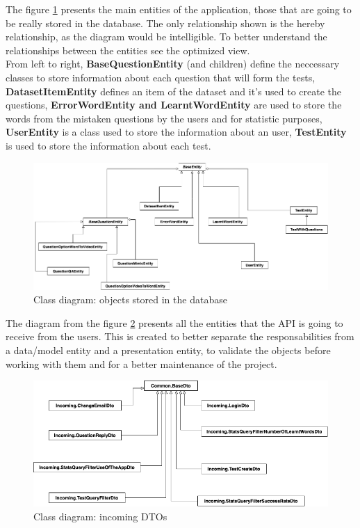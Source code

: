             The figure \ref{fig:implementation_entities_db} presents the main entities of the application, those that 
            are going to be really stored in the database. The only relationship shown is the hereby relationship, as the diagram would be intelligible. To better understand the 
            relationships between the entities see the optimized view. \\
            From left to right, \textbf{BaseQuestionEntity} (and children) define the neccessary classes to store 
            information about each question that will form the tests, \textbf{DatasetItemEntity} defines an item of the dataset and it's used to create the questions, 
            \textbf{ErrorWordEntity and LearntWordEntity} are used to store the words from the mistaken questions by the users and for statistic purposes, \textbf{UserEntity}
            is a class used to store the information about an user, \textbf{TestEntity} is used to store the information about each test.
            \begin{figure}[H]
                \centering
                    \includegraphics[width=\textwidth]{assets/diagrams/entities_bd.png}
                \caption{Class diagram: objects stored in the database}
                \label{fig:implementation_entities_db}
            \end{figure}

            The diagram from the figure \ref{fig:implementation_dto_1} presents all the entities that the API is going to receive from the users. This is created to 
            better separate the responsabilities from a data/model entity and a presentation entity, to validate the objects before working with them and for a better
            maintenance of the project.
            \begin{figure}[H]
                \centering
                    \includegraphics[width=\textwidth]{assets/diagrams/incoming_dto.png}
                \caption{Class diagram: incoming DTOs}
                \label{fig:implementation_dto_1}
            \end{figure}

